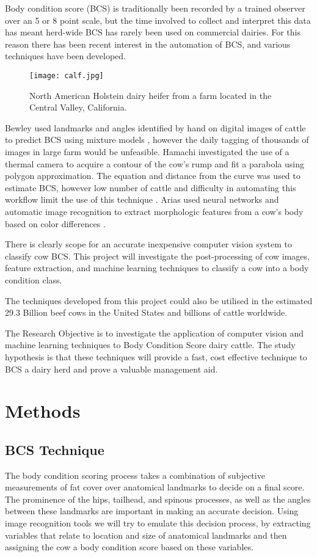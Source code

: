 \documentclass[11pt]{article}
\begin{document}
		Body condition score (BCS) is traditionally been recorded by a trained observer over an 5 or 8 point scale\cite{Bewley2010}, but the time involved to collect and interpret this data has meant herd-wide BCS has rarely been used on commercial dairies.
		For this reason there has been recent interest in the automation of BCS, and various techniques have been developed.


		\begin{figure}[b!]
			\centering
			\texttt{[image: calf.jpg]}
			\caption{North American Holstein dairy heifer from a farm located in the Central Valley, California.}
			\label{fig:}
		\end{figure}
		\newpage

		Bewley used landmarks and angles identified by hand on digital images of cattle to predict BCS using mixture models \cite{Bewley2008}, however the daily tagging of thousands of images in large farm would be unfeasible.
		Hamachi investigated the use of a thermal camera to acquire a contour of the cow's rump and fit a parabola using polygon approximation. 
		The equation and distance from the curve was used to estimate BCS, however low number of cattle and difficulty in automating this workflow limit the use of this technique \cite{Halachmi2008}. 
		Arias used neural networks and automatic image recognition to extract morphologic features from a cow's body based on color differences \cite{Arias2004}. 


		There is clearly scope for an accurate inexpensive computer vision system to classify cow BCS.
		This project will investigate the post-processing of cow images, feature extraction, and machine learning techniques to classify a cow into a body condition class.  


		The techniques developed from this project could also be utilised in the estimated 29.3 Billion beef cows in the United States\cite{USDA2013} and billions of cattle worldwide.

		The Research Objective is to investigate the application of computer vision and machine learning techniques to Body Condition Score dairy cattle.
		The study hypothesis is that these techniques will provide a fast, cost effective technique to BCS a dairy herd and prove a valuable management aid.

\newpage
\section{Methods}
	\subsection{BCS Technique}
		The body condition scoring process takes a combination of subjective measurements of fat cover over anatomical landmarks to decide on a final score.
		The prominence of the hips, tailhead, and spinous processes, as well as the angles between these landmarks are important in making an accurate decision.
		Using image recognition tools we will try to emulate this decision process, by extracting variables that relate to location and size of anatomical landmarks and then assigning the cow a body condition score based on these variables.
\end{document}
